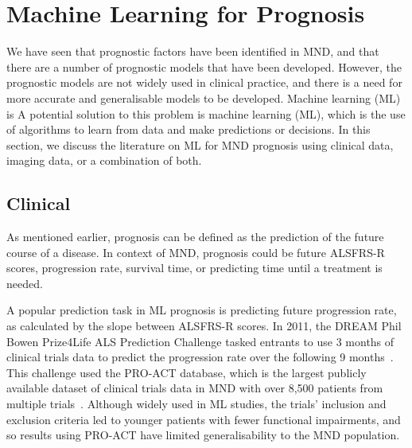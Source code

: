 \section{Machine Learning for Prognosis}

We have seen that prognostic factors have been identified in MND, and that there are a number of prognostic models that have been developed.
However, the prognostic models are not widely used in clinical practice, and there is a need for more accurate and generalisable models to be developed.
Machine learning (ML) is
A potential solution to this problem is machine learning (ML), which is the use of algorithms to learn from data and make predictions or decisions.
In this section, we discuss the literature on ML for MND prognosis using clinical data, imaging data, or a combination of both.

\subsection{Clinical}


As mentioned earlier, prognosis can be defined as the prediction of the future course of a disease.
In context of MND, prognosis could be future ALSFRS-R scores, progression rate, survival time, or predicting time until a treatment is needed.

A popular prediction task in ML prognosis is predicting future progression rate, as calculated by the slope between ALSFRS-R scores.
In 2011, the DREAM Phil Bowen Prize4Life ALS Prediction Challenge tasked entrants to use 3 months of clinical trials data to predict the progression rate over the following 9 months~\cite{kuffnerCrowdsourcedAnalysisClinical2015}.
This challenge used the PRO-ACT database, which is the largest publicly available dataset of clinical trials data in MND with over 8,500 patients from multiple trials~\cite{atassiPROACTDatabaseDesign2014}.
Although widely used in ML studies, the trials' inclusion and exclusion criteria led to younger patients with fewer functional impairments, and so results using PRO-ACT have limited generalisability to the MND population.


